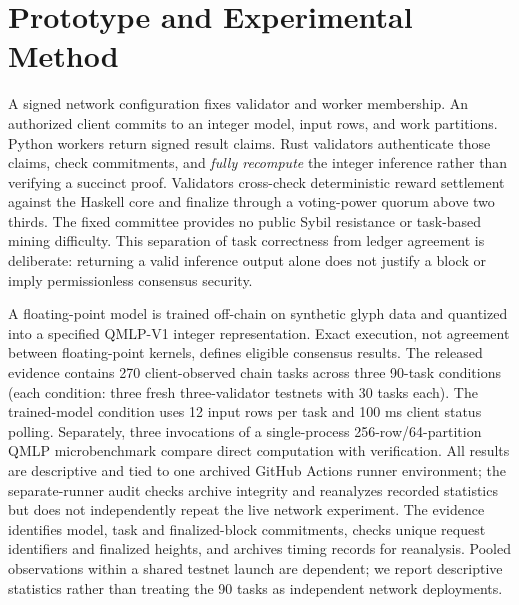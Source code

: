 \documentclass[sigconf,anonymous]{acmart}
\begin{document}
\section{Prototype and Experimental Method}
A signed network configuration fixes validator and worker membership. An authorized client commits to an integer model, input rows, and work partitions. Python workers return signed result claims. Rust validators authenticate those claims, check commitments, and \emph{fully recompute} the integer inference rather than verifying a succinct proof. Validators cross-check deterministic reward settlement against the Haskell core and finalize through a voting-power quorum above two thirds. The fixed committee provides no public Sybil resistance or task-based mining difficulty. This separation of task correctness from ledger agreement is deliberate: returning a valid inference output alone does not justify a block or imply permissionless consensus security.

A floating-point model is trained off-chain on synthetic glyph data and quantized into a specified QMLP-V1 integer representation. Exact execution, not agreement between floating-point kernels, defines eligible consensus results. The released evidence contains 270 client-observed chain tasks across three 90-task conditions (each condition: three fresh three-validator testnets with 30 tasks each). The trained-model condition uses 12 input rows per task and 100 ms client status polling. Separately, three invocations of a single-process 256-row/64-partition QMLP microbenchmark compare direct computation with verification. All results are descriptive and tied to one archived GitHub Actions runner environment; the separate-runner audit checks archive integrity and reanalyzes recorded statistics but does not independently repeat the live network experiment. The evidence identifies model, task and finalized-block commitments, checks unique request identifiers and finalized heights, and archives timing records for reanalysis. Pooled observations within a shared testnet launch are dependent; we report descriptive statistics rather than treating the 90 tasks as independent network deployments.
\end{document}
